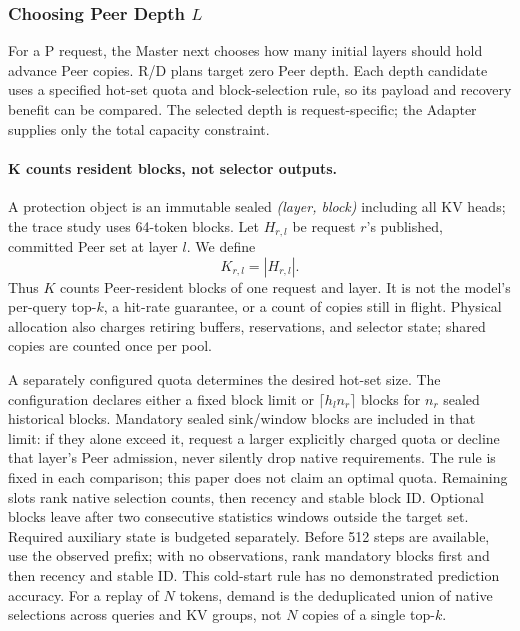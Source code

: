 \subsubsection{Choosing Peer Depth $L$}
\label{sec:kv-master-depth}

For a P request, the Master next chooses how many initial layers should
hold advance Peer copies. R/D plans target zero Peer depth. Each depth
candidate uses a specified hot-set quota and block-selection rule, so its
payload and recovery benefit can be compared. The selected depth is
request-specific; the Adapter supplies only the total capacity constraint.

\paragraph{K counts resident blocks, not selector outputs.}
A protection object is an immutable sealed \emph{(layer, block)} including
all KV heads; the trace study uses 64-token blocks. Let $H_{r,l}$ be
request $r$'s published, committed Peer set at layer $l$. We define
\begin{equation}
 K_{r,l}=|H_{r,l}|.
 \label{eq:hot-block-count}
\end{equation}
Thus $K$ counts Peer-resident blocks of one request and layer. It is not
the model's per-query top-$k$, a hit-rate guarantee, or a count of copies
still in flight. Physical allocation also charges retiring buffers,
reservations, and selector state; shared copies are counted once per pool.

A separately configured quota determines the desired hot-set size.
The configuration declares either a fixed block limit or
$\lceil h_l n_r\rceil$ blocks for $n_r$ sealed historical blocks.
Mandatory sealed sink/window blocks are included in that limit: if they
alone exceed it, request a larger explicitly charged quota or decline
that layer's Peer admission, never silently drop native requirements.
The rule is
fixed in each comparison; this paper does not claim an optimal quota.
Remaining slots rank native selection counts, then recency and stable
block ID. Optional blocks leave after two consecutive statistics windows
outside the target set. Required auxiliary state is budgeted separately.
Before 512 steps are available, use the observed prefix; with no observations,
rank mandatory blocks first and then recency and stable ID. This cold-start
rule has no demonstrated prediction accuracy.
For a replay of $N$ tokens, demand is the deduplicated union of native
selections across queries and KV groups, not $N$ copies of a single top-$k$.

